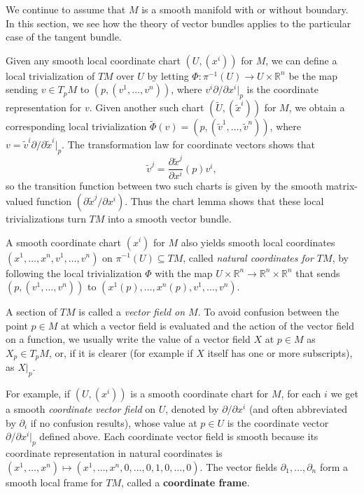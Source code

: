 We continue to assume that $M$ is a smooth manifold with or without boundary. In this section, we see how the theory of vector bundles applies to the particular case of the tangent bundle.

Given any smooth local coordinate chart $(U, (x^i))$ for $M$, we can define a local trivialization of $TM$ over $U$ by letting $\Phi: \pi^{-1}(U) \to U \times \mathbb{R}^n$ be the map sending $v \in T_pM$ to $(p, (v^1, \ldots, v^n))$, where $v^i\partial/\partial x^i|_p$ is the coordinate representation for $v$. Given another such chart $(\tilde{U}, (\tilde{x}^i))$ for $M$, we obtain a corresponding local trivialization $\tilde{\Phi}(v) = (p, (\tilde{v}^1, \ldots, \tilde{v}^n))$, where $v = \tilde{v}^i \partial/\partial \tilde{x}^i|_p$. The transformation law for coordinate vectors shows that
\[
\tilde{v}^j = \frac{\partial \tilde{x}^j}{\partial x^i}(p)v^i,
\]
so the transition function between two such charts is given by the smooth matrix-valued function $(\partial \tilde{x}^j/\partial x^i)$. Thus the chart lemma shows that these local trivializations turn $TM$ into a smooth vector bundle.

A smooth coordinate chart $(x^i)$ for $M$ also yields smooth local coordinates $(x^1,\ldots,x^n, v^1, \ldots, v^n)$ on $\pi^{-1}(U) \subseteq TM$, called \emph{natural coordinates for $TM$}, by following the local trivialization $\Phi$ with the map $U \times \mathbb{R}^n \to \mathbb{R}^n \times \mathbb{R}^n$ that sends $(p, (v^1, \ldots, v^n))$ to $(x^1(p), \ldots, x^n(p), v^1, \ldots, v^n)$.

A section of $TM$ is called a \emph{vector field on $M$}. To avoid confusion between the point $p \in M$ at which a vector field is evaluated and the action of the vector field on a function, we usually write the value of a vector field $X$ at $p \in M$ as $X_p \in T_pM$, or, if it is clearer (for example if $X$ itself has one or more subscripts), as $X|_p$.

For example, if $(U, (x^i))$ is a smooth coordinate chart for $M$, for each $i$ we get a smooth \emph{coordinate vector field} on $U$, denoted by $\partial/\partial x^i$ (and often abbreviated by $\partial_i$ if no confusion results), whose value at $p \in U$ is the coordinate vector $\partial/\partial x^i|_p$ defined above. Each coordinate vector field is smooth because its coordinate representation in natural coordinates is $(x^1, \ldots, x^n) \mapsto (x^1, \ldots, x^n, 0, \ldots, 0, 1, 0, \ldots, 0)$. The vector fields $\partial_1, \ldots, \partial_n$ form a smooth local frame for $TM$, called a \textbf{coordinate frame}.

